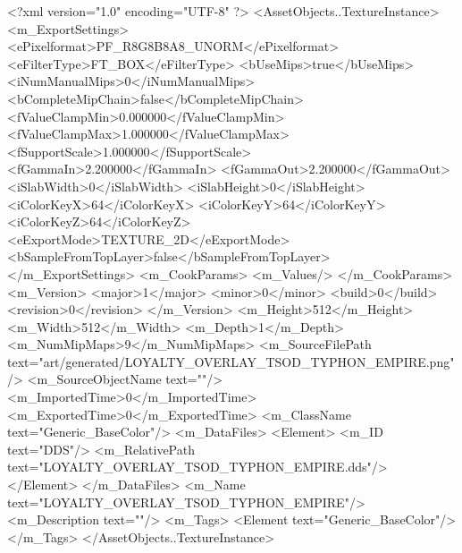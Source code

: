 <?xml version="1.0" encoding="UTF-8" ?>
<AssetObjects..TextureInstance>
	<m_ExportSettings>
		<ePixelformat>PF_R8G8B8A8_UNORM</ePixelformat>
		<eFilterType>FT_BOX</eFilterType>
		<bUseMips>true</bUseMips>
		<iNumManualMips>0</iNumManualMips>
		<bCompleteMipChain>false</bCompleteMipChain>
		<fValueClampMin>0.000000</fValueClampMin>
		<fValueClampMax>1.000000</fValueClampMax>
		<fSupportScale>1.000000</fSupportScale>
		<fGammaIn>2.200000</fGammaIn>
		<fGammaOut>2.200000</fGammaOut>
		<iSlabWidth>0</iSlabWidth>
		<iSlabHeight>0</iSlabHeight>
		<iColorKeyX>64</iColorKeyX>
		<iColorKeyY>64</iColorKeyY>
		<iColorKeyZ>64</iColorKeyZ>
		<eExportMode>TEXTURE_2D</eExportMode>
		<bSampleFromTopLayer>false</bSampleFromTopLayer>
	</m_ExportSettings>
	<m_CookParams>
		<m_Values/>
	</m_CookParams>
	<m_Version>
		<major>1</major>
		<minor>0</minor>
		<build>0</build>
		<revision>0</revision>
	</m_Version>
	<m_Height>512</m_Height>
	<m_Width>512</m_Width>
	<m_Depth>1</m_Depth>
	<m_NumMipMaps>9</m_NumMipMaps>
	<m_SourceFilePath text="art/generated/LOYALTY_OVERLAY_TSOD_TYPHON_EMPIRE.png"/>
	<m_SourceObjectName text=""/>
	<m_ImportedTime>0</m_ImportedTime>
	<m_ExportedTime>0</m_ExportedTime>
	<m_ClassName text="Generic_BaseColor"/>
	<m_DataFiles>
		<Element>
			<m_ID text="DDS"/>
			<m_RelativePath text="LOYALTY_OVERLAY_TSOD_TYPHON_EMPIRE.dds"/>
		</Element>
	</m_DataFiles>
	<m_Name text="LOYALTY_OVERLAY_TSOD_TYPHON_EMPIRE"/>
	<m_Description text=""/>
	<m_Tags>
		<Element text="Generic_BaseColor"/>
	</m_Tags>
</AssetObjects..TextureInstance>
